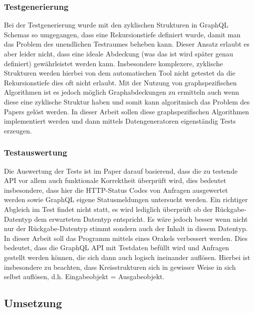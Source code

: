\subsubsection*{Testgenerierung}

Bei der Testgenerierung wurde mit den zyklischen Strukturen in GraphQL Schemas so
umgegangen, dass eine Rekursionstiefe definiert wurde, damit man das Problem des unendlichen Testraumes beheben kann.
Dieser Ansatz erlaubt es aber leider nicht, dass eine ideale Abdeckung (was das ist wird später genau
definiert) gewährleistet werden kann.
Insbesondere komplexere, zyklische Strukturen werden hierbei von dem automatischen
Tool nicht getestet da die Rekursionstiefe dies oft nicht erlaubt.
Mit der Nutzung von graphspezifischen Algorithmen ist es jedoch möglich Graphabdeckungen zu ermitteln auch wenn diese
eine zyklische Struktur haben und somit kann algoritmisch das Problem des Papers gelöst werden.
In dieser Arbeit sollen diese graphspezifischen Algorithmen implementiert werden und dann mittels Datengeneratoren eigenständig
Tests erzeugen.

\subsubsection*{Testauswertung}

Die Auswertung der Tests ist im Paper darauf basierend, dass die zu testende API vor allem auch funktionale Korrektheit überprüft wird,
dies bedeutet insbesondere, dass hier die HTTP-Status Codes von Anfragen ausgewertet werden sowie GraphQL eigene Statusmeldungen untersucht werden.
Ein richtiger Abgleich im Test findet nicht statt, es wird lediglich überprüft ob der Rückgabe-Datentyp dem erwarteten Datentyp entspricht.
Es wäre jedoch besser wenn nicht nur der Rückgabe-Datentyp stimmt sondern auch der Inhalt in diesem Datentyp. In dieser Arbeit
soll das Programm mittels eines Orakels verbessert werden. Dies bedeutet, dass die GraphQL API mit Testdaten befüllt wird und Anfragen
gestellt werden können, die sich dann auch logisch ineinander auflösen. Hierbei ist insbesondere zu beachten, dass Kreisstrukturen sich in gewisser Weise
in sich selbst auflösen, d.h. Eingabeobjekt = Ausgabeobjekt.

\subsection{Umsetzung}

